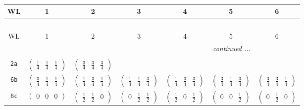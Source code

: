 \documentclass[fleqn,9pt,landscape]{jsarticle}
\begin{document}
\begin{center}
\renewcommand{\arraystretch}{1.2}
\begin{longtable}{ccccccc}
 \hline \hline
WL & 1 & 2 & 3 & 4 & 5 & 6 \\ \hline \endfirsthead

\multicolumn{6}{l}{\tablename\ \thetable{}} \\
 \hline \hline
WL & 1 & 2 & 3 & 4 & 5 & 6 \\ \hline \endhead

 \hline \hline
\multicolumn{6}{r}{\footnotesize\it continued ...} \\ \endfoot

 \hline \hline
\multicolumn{6}{r}{} \\ \endlastfoot

{\tt 2a} & $ \begin{pmatrix} \frac{1}{4} & \frac{1}{4} & \frac{1}{4} \end{pmatrix} $ & $ \begin{pmatrix} \frac{3}{4} & \frac{3}{4} & \frac{3}{4} \end{pmatrix} $ & $  $ & $  $ & $  $ & $  $ \\ \hline
{\tt 6b} & $ \begin{pmatrix} \frac{3}{4} & \frac{1}{4} & \frac{1}{4} \end{pmatrix} $ & $ \begin{pmatrix} \frac{1}{4} & \frac{3}{4} & \frac{1}{4} \end{pmatrix} $ & $ \begin{pmatrix} \frac{1}{4} & \frac{1}{4} & \frac{3}{4} \end{pmatrix} $ & $ \begin{pmatrix} \frac{1}{4} & \frac{3}{4} & \frac{3}{4} \end{pmatrix} $ & $ \begin{pmatrix} \frac{3}{4} & \frac{1}{4} & \frac{3}{4} \end{pmatrix} $ & $ \begin{pmatrix} \frac{3}{4} & \frac{3}{4} & \frac{1}{4} \end{pmatrix} $ \\ \hline
{\tt 8c} & $ \begin{pmatrix} 0 & 0 & 0 \end{pmatrix} $ & $ \begin{pmatrix} \frac{1}{2} & \frac{1}{2} & 0 \end{pmatrix} $ & $ \begin{pmatrix} 0 & \frac{1}{2} & \frac{1}{2} \end{pmatrix} $ & $ \begin{pmatrix} \frac{1}{2} & 0 & \frac{1}{2} \end{pmatrix} $ & $ \begin{pmatrix} 0 & 0 & \frac{1}{2} \end{pmatrix} $ & $ \begin{pmatrix} 0 & \frac{1}{2} & 0 \end{pmatrix} $ \\

\end{longtable}
\end{center}
\end{document}

